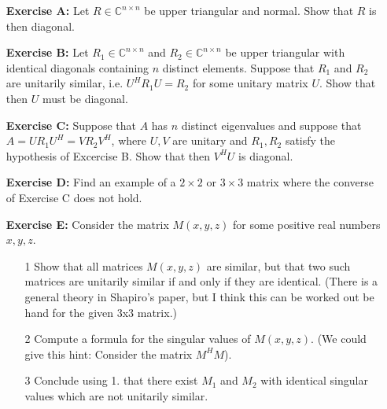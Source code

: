 \documentclass[14pt]{report}
\begin{document}
\begin{enumerate}
  \item[\textbf{Exercise A:}] Let $R\in\mathbb{C}^{n\times n}$ be upper 
    triangular and normal. Show that $R$ is then diagonal. 

  \item[\textbf{Exercise B:}] Let $R_1\in\mathbb{C}^{n\times n}$ and
    $R_2\in\mathbb{C}^{n\times n}$ be upper triangular with identical diagonals
    containing $n$ distinct elements. Suppose that $R_1$ and $R_2$ are 
    unitarily similar, i.e. $U^HR_1U = R_2$ for some unitary matrix $U$.
    Show that then $U$ must be diagonal.

  \item[\textbf{Exercise C:}] Suppose that $A$ has $n$ distinct eigenvalues and
    suppose that $A = U R_1 U^H = V R_2 V^H$, where $U,V$ are unitary and 
    $R_1, R_2$ satisfy the hypothesis of Excercise B. Show that then $V^H U$ is
    diagonal.

  \item[\textbf{Exercise D:}] Find an example of a $2\times2$ or $3\times3$
    matrix where the converse of Exercise C does not hold.

  \item[\textbf{Exercise E:}] Consider the matrix $M(x,y,z)$ for some positive
    real numbers $x,y,z$.
    \begin{enumerate}
      \item[1] Show that all matrices $M(x,y,z)$ are similar, but that two such
        matrices are unitarily similar if and only if they are identical.
        (There is a general theory in Shapiro's paper, but I think this can be
        worked out be hand for the given 3x3 matrix.)
      \item[2] Compute a formula for the singular values of $M(x,y,z)$. 
        (We could give this hint: Consider the matrix $M^H M$).
      \item[3] Conclude using 1. that there exist $M_1$ and $M_2$ with
        identical singular values which are not unitarily similar.
      \end{enumerate}
  

\end{enumerate}
\end{document}
